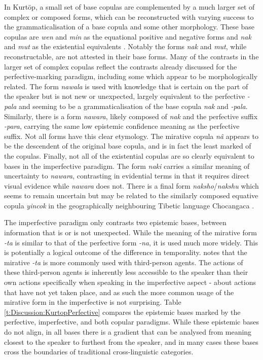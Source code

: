 In Kurtöp, a small set of base copulas are complemented by a much larger set of complex or composed forms, which can be reconstructed with varying success to the grammaticalisation of a base copula and some other morphology. These base copulas are \textit{wen} and \textit{min} as the equational positive and negative forms and \textit{nak} and \textit{mut} as the existential equivalents \cite[120]{Hyslop2014}. Notably the forms \textit{nak} and \textit{mut}, while reconstructable, are not attested in their base forms. Many of the contrasts in the larger set of complex copulas reflect the contrasts already discussed for the perfective-marking paradigm, including some which appear to be morphologically related. The form \textit{nawala} is used with knowledge that is certain on the part of the speaker but is not new or unexpected, largely equivalent to the perfective \textit{-pala} and seeming to be a grammaticalisation of the base copula \textit{nak} and \textit{-pala}. Similarly, there is a form \textit{nawara}, likely composed of \textit{nak} and the perfective suffix \textit{-para}, carrying the same low epistemic confidence meaning as the perfective suffix. Not all forms have this clear etymology. The mirative copula \textit{nâ} appears to be the descendent of the original base copula, and is in fact the least marked of the copulas. Finally, not all of the existential copulas are so clearly equivalent to bases in the imperfective paradigm. The form \textit{naki} carries a similar meaning of uncertainty to \textit{nawara}, contrasting in evidential terms in that it requires direct visual evidence while \textit{nawara} does not. There is a final form \textit{naksho}/\textit{nakshu} which seems to remain uncertain \cites[122]{Hyslop2014}[311]{Hyslop2017} but may be related to the similarly composed equative copula \textit{yincok} in the geographically neighbouring Tibetic language Chocangaca \cite{Bodnaruk2023a}.

The imperfective paradigm only contrasts two epistemic bases, between information that is or is not unexpected. While the meaning of the mirative form \textit{-ta} is similar to that of the perfective form \textit{-na}, it is used much more widely. This is potentially a logical outcome of the difference in temporality.  notes that the mirative \textit{-ta} is more commonly used with third-person agents. The actions of these third-person agents is inherently less accessible to the speaker than their own actions specifically when speaking in the imperfective aspect - about actions that have not yet taken place, and as such the more common usage of the mirative form in the imperfective is not surprising. Table \ref{t:Discussion:KurtopPerfective} compares the epistemic bases marked by the perfective, imperfective, and both copular paradigms. While these epistemic bases do not align, in all bases there is a gradient that can be analysed from meaning closest to the speaker to furthest from the speaker, and in many cases these bases cross the boundaries of traditional cross-linguistic categories.

